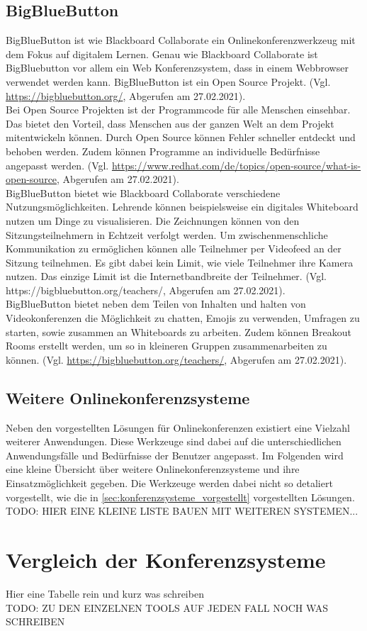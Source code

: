 \subsection{BigBlueButton}
BigBlueButton ist wie Blackboard Collaborate ein Onlinekonferenzwerkzeug mit dem Fokus auf digitalem Lernen.
Genau wie Blackboard Collaborate ist BigBluebutton vor allem ein Web Konferenzsystem, dass in einem Webbrowser verwendet werden kann.
BigBlueButton ist ein Open Source Projekt.
(Vgl. \url{https://bigbluebutton.org/}, Abgerufen am 27.02.2021).
\\
Bei Open Source Projekten ist der Programmcode für alle Menschen einsehbar.
Das bietet den Vorteil, dass Menschen aus der ganzen Welt an dem Projekt mitentwickeln können.
Durch Open Source können Fehler schneller entdeckt und behoben werden.
Zudem können Programme an individuelle Bedürfnisse angepasst werden.
(Vgl. \url{https://www.redhat.com/de/topics/open-source/what-is-open-source}, Abgerufen am 27.02.2021).
\\
BigBlueButton bietet wie Blackboard Collaborate verschiedene Nutzungsmöglichkeiten.
Lehrende können beispielsweise ein digitales Whiteboard nutzen um Dinge zu visualisieren.
Die Zeichnungen können von den Sitzungsteilnehmern in Echtzeit verfolgt werden.
Um zwischenmenschliche Kommunikation zu ermöglichen können alle Teilnehmer per Videofeed an der Sitzung teilnehmen.
Es gibt dabei kein Limit, wie viele Teilnehmer ihre Kamera nutzen. Das einzige Limit ist die Internetbandbreite der Teilnehmer.
(Vgl. https://bigbluebutton.org/teachers/, Abgerufen am 27.02.2021).
\\
BigBlueButton bietet neben dem Teilen von Inhalten und halten von Videokonferenzen die Möglichkeit zu chatten, Emojis zu verwenden, Umfragen zu starten, sowie zusammen an Whiteboards zu arbeiten.
Zudem können Breakout Rooms erstellt werden, um so in kleineren Gruppen zusammenarbeiten zu können.
(Vgl. \url{https://bigbluebutton.org/teachers/}, Abgerufen am 27.02.2021).
\\

\subsection{Weitere Onlinekonferenzsysteme}
Neben den vorgestellten Lösungen für Onlinekonferenzen existiert eine Vielzahl weiterer Anwendungen.
Diese Werkzeuge sind dabei auf die unterschiedlichen Anwendungsfälle und Bedürfnisse der Benutzer angepasst.
Im Folgenden wird eine kleine Übersicht über weitere Onlinekonferenzsysteme und ihre Einsatzmöglichkeit gegeben.
Die Werkzeuge werden dabei nicht so detaliert vorgestellt, wie die in \autoref{sec:konferenzsysteme_vorgestellt} vorgestellten Lösungen.
\\
TODO: HIER EINE KLEINE LISTE BAUEN MIT WEITEREN SYSTEMEN...

\section{Vergleich der Konferenzsysteme}
Hier eine Tabelle rein und kurz was schreiben\\
TODO: ZU DEN EINZELNEN TOOLS AUF JEDEN FALL NOCH WAS SCHREIBEN